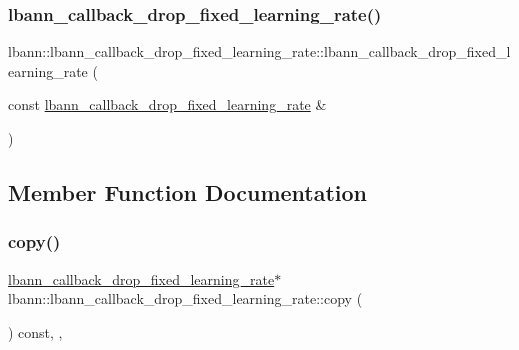 \subsubsection{\texorpdfstring{lbann\+\_\+callback\+\_\+drop\+\_\+fixed\+\_\+learning\+\_\+rate()}{lbann\_callback\_drop\_fixed\_learning\_rate()}\hspace{0.1cm}{\footnotesize\ttfamily [3/3]}}
{\footnotesize\ttfamily lbann\+::lbann\+\_\+callback\+\_\+drop\+\_\+fixed\+\_\+learning\+\_\+rate\+::lbann\+\_\+callback\+\_\+drop\+\_\+fixed\+\_\+learning\+\_\+rate (\begin{DoxyParamCaption}\item[{const \hyperlink{classlbann_1_1lbann__callback__drop__fixed__learning__rate}{lbann\+\_\+callback\+\_\+drop\+\_\+fixed\+\_\+learning\+\_\+rate} \&}]{ }\end{DoxyParamCaption})\hspace{0.3cm}{\ttfamily [default]}}



\subsection{Member Function Documentation}
\mbox{\label{classlbann_1_1lbann__callback__drop__fixed__learning__rate_aad86be992434394974b50d1f1c303bbf}} 
\subsubsection{\texorpdfstring{copy()}{copy()}}
{\footnotesize\ttfamily \hyperlink{classlbann_1_1lbann__callback__drop__fixed__learning__rate}{lbann\+\_\+callback\+\_\+drop\+\_\+fixed\+\_\+learning\+\_\+rate}$\ast$ lbann\+::lbann\+\_\+callback\+\_\+drop\+\_\+fixed\+\_\+learning\+\_\+rate\+::copy (\begin{DoxyParamCaption}{ }\end{DoxyParamCaption}) const\hspace{0.3cm}{\ttfamily [inline]}, {\ttfamily [override]}, {\ttfamily [virtual]}}



